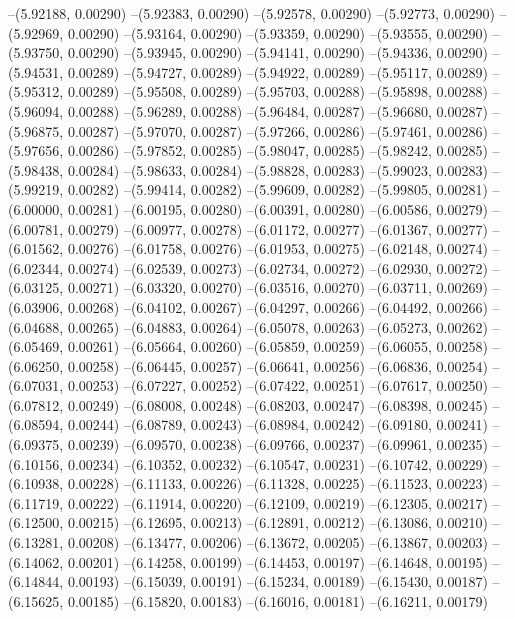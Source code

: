 --(5.92188, 0.00290)
--(5.92383, 0.00290)
--(5.92578, 0.00290)
--(5.92773, 0.00290)
--(5.92969, 0.00290)
--(5.93164, 0.00290)
--(5.93359, 0.00290)
--(5.93555, 0.00290)
--(5.93750, 0.00290)
--(5.93945, 0.00290)
--(5.94141, 0.00290)
--(5.94336, 0.00290)
--(5.94531, 0.00289)
--(5.94727, 0.00289)
--(5.94922, 0.00289)
--(5.95117, 0.00289)
--(5.95312, 0.00289)
--(5.95508, 0.00289)
--(5.95703, 0.00288)
--(5.95898, 0.00288)
--(5.96094, 0.00288)
--(5.96289, 0.00288)
--(5.96484, 0.00287)
--(5.96680, 0.00287)
--(5.96875, 0.00287)
--(5.97070, 0.00287)
--(5.97266, 0.00286)
--(5.97461, 0.00286)
--(5.97656, 0.00286)
--(5.97852, 0.00285)
--(5.98047, 0.00285)
--(5.98242, 0.00285)
--(5.98438, 0.00284)
--(5.98633, 0.00284)
--(5.98828, 0.00283)
--(5.99023, 0.00283)
--(5.99219, 0.00282)
--(5.99414, 0.00282)
--(5.99609, 0.00282)
--(5.99805, 0.00281)
--(6.00000, 0.00281)
--(6.00195, 0.00280)
--(6.00391, 0.00280)
--(6.00586, 0.00279)
--(6.00781, 0.00279)
--(6.00977, 0.00278)
--(6.01172, 0.00277)
--(6.01367, 0.00277)
--(6.01562, 0.00276)
--(6.01758, 0.00276)
--(6.01953, 0.00275)
--(6.02148, 0.00274)
--(6.02344, 0.00274)
--(6.02539, 0.00273)
--(6.02734, 0.00272)
--(6.02930, 0.00272)
--(6.03125, 0.00271)
--(6.03320, 0.00270)
--(6.03516, 0.00270)
--(6.03711, 0.00269)
--(6.03906, 0.00268)
--(6.04102, 0.00267)
--(6.04297, 0.00266)
--(6.04492, 0.00266)
--(6.04688, 0.00265)
--(6.04883, 0.00264)
--(6.05078, 0.00263)
--(6.05273, 0.00262)
--(6.05469, 0.00261)
--(6.05664, 0.00260)
--(6.05859, 0.00259)
--(6.06055, 0.00258)
--(6.06250, 0.00258)
--(6.06445, 0.00257)
--(6.06641, 0.00256)
--(6.06836, 0.00254)
--(6.07031, 0.00253)
--(6.07227, 0.00252)
--(6.07422, 0.00251)
--(6.07617, 0.00250)
--(6.07812, 0.00249)
--(6.08008, 0.00248)
--(6.08203, 0.00247)
--(6.08398, 0.00245)
--(6.08594, 0.00244)
--(6.08789, 0.00243)
--(6.08984, 0.00242)
--(6.09180, 0.00241)
--(6.09375, 0.00239)
--(6.09570, 0.00238)
--(6.09766, 0.00237)
--(6.09961, 0.00235)
--(6.10156, 0.00234)
--(6.10352, 0.00232)
--(6.10547, 0.00231)
--(6.10742, 0.00229)
--(6.10938, 0.00228)
--(6.11133, 0.00226)
--(6.11328, 0.00225)
--(6.11523, 0.00223)
--(6.11719, 0.00222)
--(6.11914, 0.00220)
--(6.12109, 0.00219)
--(6.12305, 0.00217)
--(6.12500, 0.00215)
--(6.12695, 0.00213)
--(6.12891, 0.00212)
--(6.13086, 0.00210)
--(6.13281, 0.00208)
--(6.13477, 0.00206)
--(6.13672, 0.00205)
--(6.13867, 0.00203)
--(6.14062, 0.00201)
--(6.14258, 0.00199)
--(6.14453, 0.00197)
--(6.14648, 0.00195)
--(6.14844, 0.00193)
--(6.15039, 0.00191)
--(6.15234, 0.00189)
--(6.15430, 0.00187)
--(6.15625, 0.00185)
--(6.15820, 0.00183)
--(6.16016, 0.00181)
--(6.16211, 0.00179)

